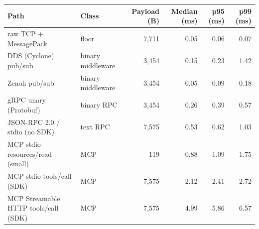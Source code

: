 \begin{tabular}{llrrrr}
\toprule
\rowcolor{blue!6}\textbf{Path} & \textbf{Class} & \textbf{Payload (B)} & \textbf{Median (ms)} & \textbf{p95 (ms)} & \textbf{p99 (ms)} \\
\midrule
raw TCP + MessagePack & floor & 7,711 & 0.05 & 0.06 & 0.07 \\
DDS (Cyclone) pub/sub & binary middleware & 3,454 & 0.15 & 0.23 & 1.42 \\
Zenoh pub/sub & binary middleware & 3,454 & 0.05 & 0.09 & 0.18 \\
gRPC unary (Protobuf) & binary RPC & 3,454 & 0.26 & 0.39 & 0.57 \\
JSON-RPC 2.0 / stdio (no SDK) & text RPC & 7,575 & 0.53 & 0.62 & 1.03 \\
MCP stdio resources/read (small) & MCP & 119 & 0.88 & 1.09 & 1.75 \\
MCP stdio tools/call (SDK) & MCP & 7,575 & 2.12 & 2.41 & 2.72 \\
MCP Streamable HTTP tools/call (SDK) & MCP & 7,575 & 4.99 & 5.86 & 6.57 \\
\bottomrule
\end{tabular}
